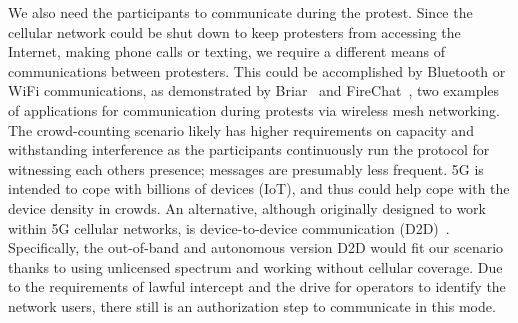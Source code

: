 We also need the participants to communicate during the protest.
Since the cellular network could be shut down to keep protesters from accessing 
the Internet, making phone calls or texting, we require a different means of 
communications between protesters. This could be accomplished by Bluetooth or 
WiFi communications, as demonstrated by Briar~\cite{Briar} and 
FireChat~\cite{FireChat}, two examples of applications for communication during 
protests via wireless mesh networking. The crowd-counting scenario likely has 
higher requirements on capacity and withstanding interference as the 
participants continuously run the protocol for witnessing each others presence; 
messages are presumably less frequent. 5G is intended to cope with billions of 
devices (IoT), and thus could help cope with the device density in crowds.
An alternative, although originally designed to work within 5G cellular networks, is device-to-device communication (D2D)~\cite{D2D}. 
Specifically, the out-of-band and autonomous version D2D would fit our
scenario thanks to using unlicensed spectrum and working without
cellular coverage. Due to the requirements of lawful intercept and the
drive for operators to identify the network users, there still is an
authorization step to communicate in this mode.
